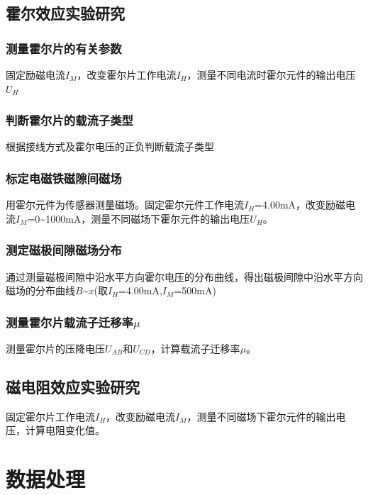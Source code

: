 \documentclass[UTF8]{ctexart}
\begin{document}
\subsection{霍尔效应实验研究}

\subsubsection{测量霍尔片的有关参数}

固定励磁电流$I_M$，改变霍尔片工作电流$I_H$，测量不同电流时霍尔元件的输出电压$U_H$

\subsubsection{判断霍尔片的载流子类型}

根据接线方式及霍尔电压的正负判断载流子类型

\subsubsection{标定电磁铁磁隙间磁场}

用霍尔元件为传感器测量磁场。固定霍尔元件工作电流$I_H$=4.00mA，改变励磁电流$I_M$=0\~{}1000mA，测量不同磁场下霍尔元件的输出电压$U_H$。

\subsubsection{测定磁极间隙磁场分布}

通过测量磁极间隙中沿水平方向霍尔电压的分布曲线，得出磁极间隙中沿水平方向磁场的分布曲线$B$\~{}$x$(取$I_H$=4.00mA,$I_M$=500mA)

\subsubsection{测量霍尔片载流子迁移率$\mu$}

测量霍尔片的压降电压$U_{AB}$和$U_{CD}$，计算载流子迁移率$\mu$。

\subsection{磁电阻效应实验研究}

固定霍尔片工作电流$I_H$，改变励磁电流$I_M$，测量不同磁场下霍尔元件的输出电压，计算电阻变化值。

\section{数据处理}
\end{document}
